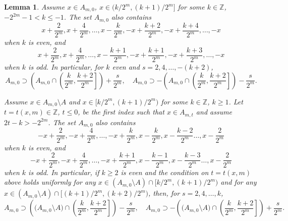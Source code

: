 \documentclass[12pt,reqno]{amsart}
\newcommand{\Z}{{\mathbb Z}}
\newtheorem{lem}[thm]{Lemma}
\numberwithin{equation}{section}
\begin{document}
\begin{lem}\label{welldistributed}
  Assume $x\in A_{m,0}$,  $x\in(k/2^m, (k+1)/2^m]$ for some $k\in\Z$, $-2^{2m}-1<k\leq-1$. The set $A_{m,0}$ also contains
\begin{equation}\label{welldist-keven}
x+\frac{2}{2^m}, x+\frac{4}{2^m},\dots, x-\frac{k}{2^m}, -x+\frac{k+2}{2^m}, -x+\frac{k+4}{2^m}, \dots,  -x
\end{equation}
when $k$ is even, and
\begin{equation}\label{welldist-kodd}
x+\frac{2}{2^m},x+\frac{4}{2^m},\dots, x-\frac{k+1}{2^m}, -x+\frac{k+1}{2^m}, -x+\frac{k+3}{2^m}, \dots, -x
\end{equation}
when $k$ is odd. In particular, for $k$ even and $s=2, 4,\dots,-(k+2)$,
\begin{equation}\label{inclusions-}
A_{m,0}\supset \left(A_{m,0}\cap\left(\frac{k}{2^m},\frac{k+2}{2^m}\right]\right) + \frac{s}{2^m}, \quad  A_{m,0}\supset-\left(A_{m,0}\cap\left(\frac{k}{2^m},\frac{k+2}{2^m}\right]\right) - \frac{s}{2^m}.
\end{equation}

 Assume $x\in A_{m,0}\setminus A$ and $x\in[k/2^m, (k+1)/2^m)$ for some $k\in\Z$, $k\geq 1$. Let $t=t(x,m)\in\Z$, $t\le 0$, be the first index such that $x\in A_{m,t}$ and assume $2t-k>-2^{2m}$.  The set $A_{m,0}$ also contains
\begin{equation}\label{welldist+keven}
  -x+\frac{2}{2^m},-x+\frac{4}{2^m},\dots,-x+\frac{k}{2^m},
 x-\frac{k}{2^m}, x-\frac{k-2}{2^m} \dots,  x-\frac2{2^m}
\end{equation}
when $k$ is even, and
\begin{equation}\label{welldist+kodd}
  -x+\frac{2}{2^m},-x+\frac{4}{2^m},\dots,-x+\frac{k+1}{2^m},
 x-\frac{k-1}{2^m}, x-\frac{k-3}{2^m} \dots,  x-\frac2{2^m}
\end{equation}
when $k$ is odd. In particular, if $k\ge 2$ is even and the condition on $t=t(x,m)$ above holds uniformly for any $x\in(A_{m,0}\setminus A)\cap[k/2^m, (k+1)/2^m)$ and for any $x\in(A_{m,0}\setminus A)\cap[(k+1)/2^m, (k+2)/2^m)$, then, for $s=2,4,\dots,k$,
\begin{equation}\label{inclusions+}
A_{m,0}\supset \left(\big(A_{m,0}\setminus A\big)\cap\left(\frac{k}{2^m},\frac{k+2}{2^m}\right]\right) - \frac{s}{2^m}, \quad  A_{m,0}\supset-\left(\big(A_{m,0}\setminus A\big)\cap\left(\frac{k}{2^m},\frac{k+2}{2^m}\right]\right) + \frac{s}{2^m}.
\end{equation}
\end{lem}
\end{document}
